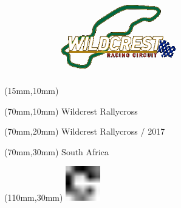 \null\newpage
\begin{textblock*}{50mm}(15mm,10mm)%
\includegraphics[width=50mm]{LG/WIL.png}
\end{textblock*}
\begin{textblock*}{130mm}(70mm,10mm)%
{\fontsize{20}{20}\selectfont Wildcrest Rallycross}\\
\end{textblock*}
\begin{textblock*}{120mm}(70mm,20mm)%
{\fontsize{16}{16}\selectfont Wildcrest Rallycross / 2017}\\
\end{textblock*}
\begin{textblock*}{120mm}(70mm,30mm)%
{\fontsize{12}{12}\selectfont South Africa}
\end{textblock*}
\begin{textblock*}{30mm}(110mm,30mm)%
\centering
\includegraphics[height=15mm]{icons/fa-rotate-right.pdf}
\end{textblock*}
